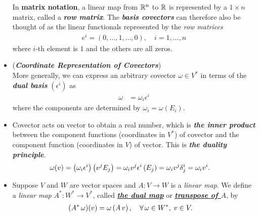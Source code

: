 \documentclass[11pt]{article}
\begin{document}
\begin{itemize}
\begin{example}
In \textbf{matrix notation}, a linear map from ${\mathbb R}^n$ to ${\mathbb R}$ is represented by a $1 \times n$ matrix, called a \emph{\textbf{row matrix}}. The \emph{\textbf{basis covectors}} can therefore also be thought of as the linear functionals represented by the \emph{row matrices}
\begin{align}
e^{i} = (0,\ldots, 1, \ldots, 0), \quad i=1,\ldots, n \label{eqn: covector_basis_row_mat}
\end{align} where $i$-th element is $1$ and the others are all zeros.
\end{example}

\item  \begin{remark} (\emph{\textbf{Coordinate Representation of Covectors}})\\
More generally, we can express an arbitrary covector $\omega \in V^{*}$ in terms of the \emph{\textbf{dual basis}} $(\epsilon^i)$ as
\begin{align}
\omega & = \omega_i \epsilon^{i} \label{eqn: covector_linear_reprsent_via_basis}
\end{align} where the components are determined by $\omega_i = \omega(E_i)$. 
\end{remark}

\item \begin{remark}
Covector acts on vector to obtain a real number, which is \emph{\textbf{the inner product}} between the component functions (coordinates in $V^*$) of covector and the component function (coordinates in $V$) of vector. This is \textit{\textbf{the duality principle}}.
\begin{align}
\omega(v) &= \left(\omega_i \epsilon^{i}\right)\left(v^{j} E_j\right) = \omega_i v^{j} \epsilon^{i}\left(E_j\right) = \omega_i v^{j} \delta_{j}^{i} =  \omega_i v^{i}. \label{eqn: duality}
\end{align}
\end{remark}

\item 
\begin{definition}
Suppose $V$ and $W$ are vector spaces and $A: V \rightarrow W$ is a \emph{linear map}. We define a \emph{linear map} $A^{*}: W^{*} \rightarrow V^{*}$, called \underline{\emph{\textbf{the dual map}}} or \underline{\textbf{\emph{transpose of $A$}}}, by
\begin{align}
(A^{*}\,\omega)(v) &= \omega\left(A\,v\right), \quad \forall\, \omega \in W^{*}, \; v \in V. \label{eqn: dual_map}
\end{align}
\end{definition}


\end{itemize}
\end{document}
